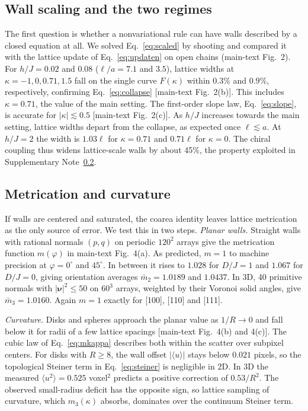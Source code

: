 \documentclass[11pt,a4paper]{article}
\begin{document}
\subsection{Wall scaling and the two regimes}\label{subsec:res:wall}
The first question is whether a nonvariational rule can have walls described by a closed equation at all. We solved Eq.~\eqref{eq:scaled} by shooting and compared it with the lattice update of Eq.~\eqref{eq:updaten} on open chains (main-text Fig.~2). For $h/J=0.02$ and $0.08$ ($\ell/a=7.1$ and $3.5$), lattice widths at $\kappa=-1,0,0.71,1.5$ fall on the single curve $F(\kappa)$ within $0.3\%$ and $0.9\%$, respectively, confirming Eq.~\eqref{eq:collapse} [main-text Fig.~2(b)]. This includes $\kappa=0.71$, the value of the main setting. The first-order slope law, Eq.~\eqref{eq:slope}, is accurate for $|\kappa|\lesssim0.5$ [main-text Fig.~2(c)]. As $h/J$ increases towards the main setting, lattice widths depart from the collapse, as expected once $\ell\lesssim a$. At $h/J=2$ the width is $1.03\ell$ for $\kappa=0.71$ and $0.71\ell$ for $\kappa=0$. The chiral coupling thus widens lattice-scale walls by about 45\%, the property exploited in Supplementary Note~\ref{subsec:res:metric}.



\subsection{Metrication and curvature}\label{subsec:res:metric}
If walls are centered and saturated, the coarea identity leaves lattice metrication as the only source of error. We test this in two steps. \emph{Planar walls.} Straight walls with rational normals $(p,q)$ on periodic $120^2$ arrays give the metrication function $m(\varphi)$ in main-text Fig.~4(a). As predicted, $m=1$ to machine precision at $\varphi=0^\circ$ and $45^\circ$. In between it rises to $1.028$ for $D/J=1$ and $1.067$ for $D/J=0$, giving orientation averages $\bar m_2=1.0189$ and $1.0437$. In 3D, 40 primitive normals with $|\bm\nu|^2\le50$ on $60^3$ arrays, weighted by their Voronoi solid angles, give $\bar m_3=1.0160$. Again $m=1$ exactly for [100], [110] and [111].

\emph{Curvature.} Disks and spheres approach the planar value as $1/R\to0$ and fall below it for radii of a few lattice spacings [main-text Fig.~4(b) and 4(c)]. The cubic law of Eq.~\eqref{eq:mkappa} describes both within the scatter over subpixel centers. For disks with $R\ge8$, the wall offset $|\langle u\rangle|$ stays below $0.021$ pixels, so the topological Steiner term in Eq.~\eqref{eq:steiner} is negligible in 2D. In 3D the measured $\langle u^2\rangle=0.525$ voxel$^2$ predicts a positive correction of $0.53/R^2$. The observed small-radius deficit has the opposite sign, so lattice sampling of curvature, which $m_3(\kappa)$ absorbs, dominates over the continuum Steiner term.
\end{document}
